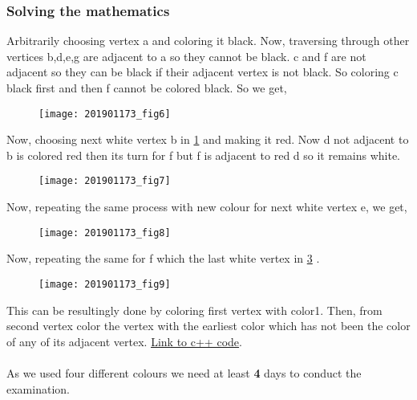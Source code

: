 \documentclass{article}
\begin{document}
\subsubsection{Solving the mathematics}
Arbitrarily choosing vertex a and coloring it black. Now, traversing through other vertices b,d,e,g are adjacent to a so they cannot be black. c and f are not adjacent so they can be black if their adjacent vertex is not black. So coloring c black first and then f cannot be colored black. So we get,

\newpage

\begin{figure}[h]
    \texttt{[image: 201901173\_fig6]}
    \caption{}
    \label{fig:201901173_fig6}
\end{figure}

Now, choosing next white vertex b in \ref{fig:201901173_fig6}  and making it red. Now d not adjacent to b is colored red then its turn for f but f is adjacent to red d so it remains white.

\begin{figure}[h]
    \texttt{[image: 201901173\_fig7]}
    \caption{}
    \label{fig:201901173_fig7}
\end{figure}

Now, repeating the same process with new colour for next white vertex e, we get,

\newpage

\begin{figure}[h]
    \texttt{[image: 201901173\_fig8]}
    \caption{}
    \label{fig:201901173_fig8}
\end{figure}

Now, repeating the same for f which the last white vertex in \ref{fig:201901173_fig8} .

\begin{figure}[h]
    \texttt{[image: 201901173\_fig9]}
    \caption{}
    \label{fig:201901173_fig9}
\end{figure}

This can be resultingly done by coloring first vertex with color1. Then, from second vertex color the vertex with the earliest color which has not been the color of any of its adjacent vertex. \href{https://sites.google.com/view/201901173/cpp}{\underline {Link to c++ code}}.
\paragraph{}
As we used four different colours we need at least {\bf4} days to conduct the examination.\\ 
\end{document}
